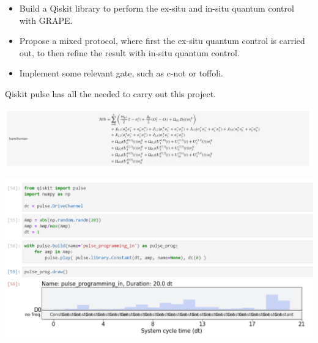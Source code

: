 \documentclass[12pt,aspectratio=169]{beamer}
\begin{document}
	\begin{frame}
		\begin{itemize}
			\item Build a Qiskit library to perform the ex-situ and in-situ quantum control with GRAPE.\\
			\vspace{0.1cm}
			\item Propose a mixed protocol, where first the ex-situ quantum control is carried out, to then refine the result with in-situ quantum control.\\
			\vspace{0.1cm}
			\item Implement some relevant gate, such as c-not or toffoli.
		\end{itemize}
		
	\end{frame}
	
	\begin{frame}
		\centering
		
		Qiskit pulse has all the needed to carry out this project.
		
		\includegraphics[scale=0.4]{hamiltonian_qiskit}
		
		\includegraphics[scale=0.4]{grape_qiskit}
		
	\end{frame}
	
\end{document}

